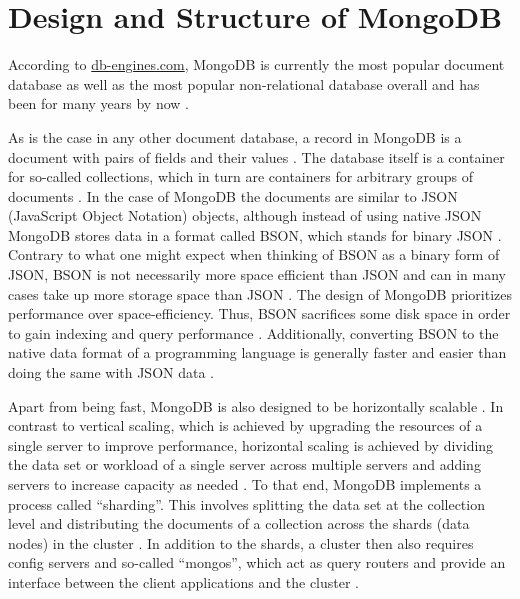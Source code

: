 
\section{Design and Structure of MongoDB}
According to \url{db-engines.com}, MongoDB is currently the most popular document database as well as the most popular non-relational database overall
and has been for many years by now \parencite{DB-Engines-Ranking, DB-Engines-Trend}. 

As is the case in any other document database, a record in MongoDB is a document with pairs of fields and their values \parencite[p. 90]{chauhan2019review}. 
The database itself is a container for so-called collections, which in turn are containers for arbitrary groups of documents \parencite[p. 90]{chauhan2019review}.
In the case of MongoDB the documents are similar to JSON (JavaScript Object Notation) objects, although instead of using native JSON MongoDB stores data 
in a format called BSON, which stands for binary JSON \parencites[p. 4]{Membrey2014}[p. 90]{chauhan2019review}. Contrary to what one might expect when 
thinking of BSON as a binary form of JSON, BSON is not necessarily more space efficient than JSON and can in many cases take up more storage space than JSON \parencite[p. 11]{Membrey2014}. 
The design of MongoDB prioritizes performance over space-efficiency. Thus, BSON sacrifices some disk space in order to gain indexing and query performance \parencite[p. 11]{Membrey2014}.
Additionally, converting BSON to the native data format of a programming language is generally faster and easier than doing the same with JSON data \parencite[p. 11]{Membrey2014}. 

Apart from being fast, MongoDB is also designed to be horizontally scalable \parencite[pp. 2, 6-7]{Membrey2014}. In contrast to vertical scaling, which is achieved by upgrading the resources
of a single server to improve performance, horizontal scaling is achieved by dividing the data set or workload of a single server across multiple servers and adding
servers to increase capacity as needed \parencite{Mongo-Sharding}. To that end, MongoDB implements a process called \enquote{sharding}. This involves splitting the 
data set at the collection level and distributing the documents of a collection across the shards (data nodes) in the cluster \parencites{Mongo-Sharding}[p. 7]{Membrey2014}.
In addition to the shards, a cluster then also requires config servers and so-called \enquote{mongos}, which act as query routers and provide an interface between the 
client applications and the cluster \parencite{Mongo-Sharding}.

